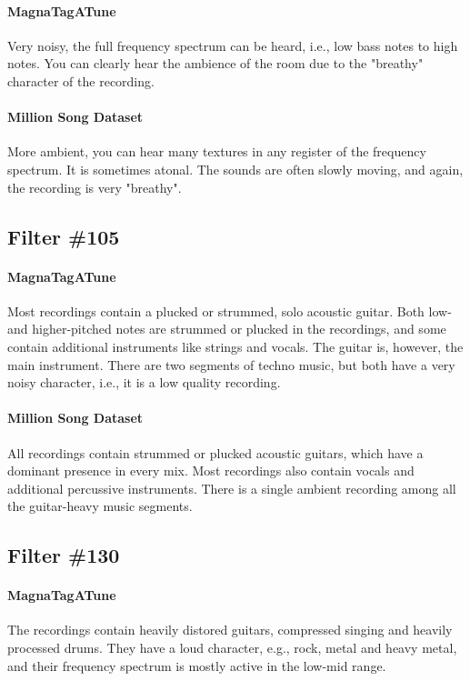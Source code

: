 \paragraph{MagnaTagATune}
Very noisy, the full frequency spectrum can be heard, i.e., low bass notes to high notes. You can clearly hear the ambience of the room due to the "breathy" character of the recording.

\paragraph{Million Song Dataset}
More ambient, you can hear many textures in any register of the frequency spectrum. It is sometimes atonal. The sounds are often slowly moving, and again, the recording is very "breathy".


\subsection*{Filter \#105}
\paragraph{MagnaTagATune}
Most recordings contain a plucked or strummed, solo acoustic guitar. Both low- and higher-pitched notes are strummed or plucked in the recordings, and some contain additional instruments like strings and vocals. The guitar is, however, the main instrument. There are two segments of techno music, but both have a very noisy character, i.e., it is a low quality recording. 

\paragraph{Million Song Dataset}
All recordings contain strummed or plucked acoustic guitars, which have a dominant presence in every mix. Most recordings also contain vocals and additional percussive instruments. There is a single ambient recording among all the guitar-heavy music segments.


\subsection*{Filter \#130}
\paragraph{MagnaTagATune}
The recordings contain heavily distored guitars,  compressed singing and heavily processed drums. They have a loud character, e.g., rock, metal and heavy metal, and their frequency spectrum is mostly active in the low-mid range.

